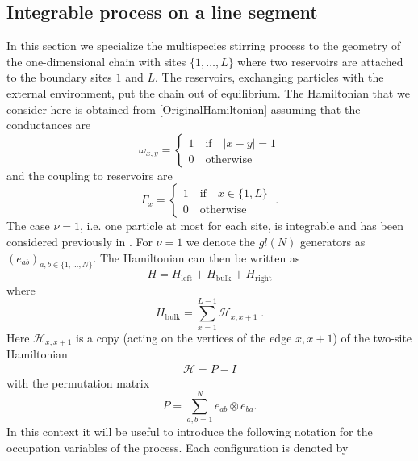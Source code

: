 \documentclass[10pt]{article}
\numberwithin{equation}{section}
\numberwithin{equation}{subsection}
\newcommand{\id}{I}
\newcommand{\dt}{\;.}
\begin{document}
\subsection{Integrable process on a line segment}\label{subsection-description-process-LINE}
In this section we specialize the multispecies stirring process to the geometry of the one-dimensional chain with sites $\{1,\ldots,L\}$ where two reservoirs are attached to the boundary sites $1$ and $L$.  The reservoirs, exchanging particles with the external environment, put the chain out of equilibrium.  The  Hamiltonian that we consider here is obtained from \eqref{OriginalHamiltonian} assuming that the conductances are
\begin{equation}
	\omega_{x,y}=\begin{cases}
		1 \quad \text{if}\quad |x-y|=1\\
		0\quad \text{otherwise}
	\end{cases}
\end{equation}
and the coupling to reservoirs are
\begin{equation}
	\Gamma_{x}=\begin{cases}
		1\quad \text{if} \quad x\in \{1,L\}\\
		0\quad \text{otherwise}
	\end{cases}\dt
\end{equation}
The case $\nu=1$, i.e. one particle at most for each site, is integrable and has been considered previously in \cite{vanicat2017exact}. 
For  $\nu=1$ we denote the ${gl}(N)$  generators   as  $(e_{ab})_{a,b\in\{1,\ldots,N\}}$.
The Hamiltonian can then be written as
\begin{equation}\label{hamiltonian}
	H=H_{\text{left}}+H_{\text{bulk}}+H_{\text{right}}
\end{equation}
where
\begin{equation}
	H_{\text{bulk}}=\sum_{x=1}^{L-1}\mathcal{H}_{x,x+1}\dt
\end{equation}
Here $\mathcal{H}_{x,x+1}$  is a copy (acting on the vertices of the edge $x,x+1$) of the two-site Hamiltonian
\begin{equation}\label{H-corsivo}
	\begin{split}
		\mathcal{H}=P-\id
	\end{split}
\end{equation}
with the permutation matrix
\begin{equation}
	P=\sum_{a,b=1}^Ne_{ab}\otimes e_{ba}.
\end{equation} 
 In this context it will be useful to introduce the following notation for the occupation variables of the process. Each configuration is denoted by
\end{document}
